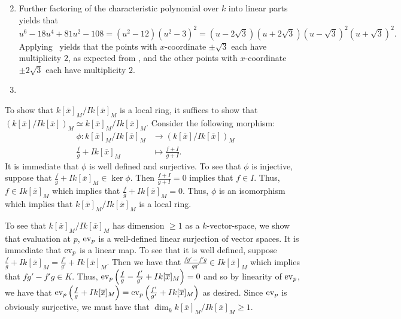 \documentclass[letterpaper, 11pt, oneside]{book}
\begin{document}
\begin{sol}
\begin{enumerate}
\[          \]
    \clearpage
    \item Further factoring of the characteristic polynomial over $k$ into linear parts yields that
          \[
            u^{6} - 18u^{4} + 81u^{2} - 108 = (u^{2} - 12)(u^{2} - 3)^{2} = (u - 2\sqrt{3})(u + 2\sqrt{3})(u - \sqrt{3})^{2}(u + \sqrt{3})^{2}.
          \]
          Applying~\cite[\S 4.2, Proposition 2.7]{book:UAG} yields that the points with $x$-coordinate $\pm \sqrt{3}$ each have multiplicity $2$, as expected from , and the other points with $x$-coordinate $\pm 2\sqrt{3}$ each have multiplicity $2$.
    \item {}
  \end{enumerate}
\end{sol}

\begin{sol}\label{ex:UAG_4.2.6}
  To show that $k[\overline{x}]_{M} / I k[\overline{x}]_{M}$ is a local ring, it suffices to show that $(k[\overline{x}] / I k[\overline{x}])_{M} \simeq k[\overline{x}]_{M} / I k[\overline{x}]_{M}$.
  Consider the following morphism:
  \begin{align*}
    \phi\colon k[\overline{x}]_{M} / I k[\overline{x}]_{M} &\to  (k[\overline{x}] / I k[\overline{x}])_{M} \\
                       \frac{f}{g} + I k[\overline{x}]_{M} &\mapsto \frac{f + I}{g + I}.
  \end{align*}
  It is immediate that $\phi$ is well defined and surjective.
  To see that $\phi$ is injective, suppose that $\frac{f}{g} + Ik[\overline{x}]_{M} \in \ker \phi$.
  Then $\frac{f + I}{g + I} = 0$ implies that $f \in I$.
  Thus, $f \in I k[\overline{x}]_{M}$ which implies that $\frac{f}{g} + I k[\overline{x}]_{M} = 0$.
  Thus, $\phi$ is an isomorphism which implies that $k[\overline{x}]_{M} / I k[\overline{x}]_{M}$ is a local ring.

  To see that $k[\overline{x}]_{M} / I k[\overline{x}]_{M}$ has dimension $\geq 1$ as a $k$-vector-space, we show that evaluation at $p$, $\operatorname{ev}_{p}$ is a well-defined linear surjection of vector spaces.
  It is immediate that $\operatorname{ev}_{p}$ is a linear map.
  To see that it is well defined, suppose $\frac{f}{g} + I k[\overline{x}]_{M} = \frac{f'}{g'} + I k[\overline{x}]_{M}$.
  Then we have that $\frac{fg' - f'g}{gg'} \in Ik[\overline{x}]_{M}$ which implies that $fg' - f'g \in K$.
  Thus, $\evaluation_{p}\pqty{\frac{f}{g} - \frac{f'}{g'} + I k[\overline{x}]_{M}} = 0$ and so by linearity of $\operatorname{ev}_{p}$, we have that $\evaluation_{p}\pqty{\frac{f}{g} + I k[\overline{x}]_{M}} = \evaluation_{p}\pqty{\frac{f'}{g'} + I k[\overline{x}]_{M}}$ as desired.
  Since $\operatorname{ev}_{p}$ is obviously surjective, we must have that $\dim_{k}k[\overline{x}]_{M} / I k[\overline{x}]_{M} \geq 1$.
\end{sol}
\end{document}
